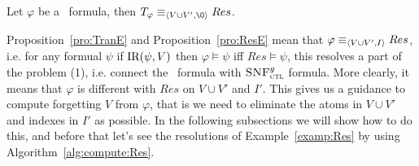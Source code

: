 \documentclass[letterpaper]{article}
\begin{document}
\begin{proposition}\label{pro:ResE}
 Let $\varphi$ be a \CTL\ formula,
 then $T_{\varphi} \equiv_{\tuple{V \cup V', {\O}}} Res$.
\end{proposition}








Proposition~\ref{pro:TranE} and Proposition~\ref{pro:ResE} mean that $\varphi \equiv_{{\langle{V \cup V', I}\rangle}} Res$, i.e. for any formual $\psi$ if $\textrm{IR}(\psi, V)$ then $\varphi \models \psi$ iff $Res \models \psi$, this resolves a part of the problem (1), i.e. connect the \CTL\ formula with ${\textsc{SNF}_{\textsc{ctl}}^g}$ formula. More clearly, it means that $\varphi$ is different with $Res$ on $V \cup V'$ and $I'$. This gives us a guidance to compute forgetting $V$ from $\varphi$, that is we need to eliminate the atoms in $V \cup V'$ and indexes in $I'$ 
as possible. In the following subsections we will show how to do this, and before that let's see the resolutions of Example~\ref{examp:Res} by using Algorithm~\ref{alg:compute:Res}.
\end{document}
